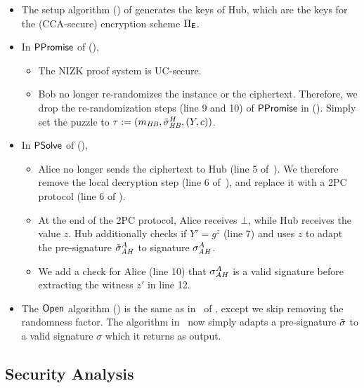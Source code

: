 \begin{itemize}
    \item The setup algorithm () of \aaluc generates the keys of Hub, which are the keys for the (CCA-secure) encryption scheme $\Pi_{\mathsf{E}}$. 
    \item In $\mathsf{PPromise}$ of \aaluc (),
    \begin{itemize}
        \item The NIZK proof system  is UC-secure.
        \item Bob no longer re-randomizes the instance or the ciphertext. Therefore, we drop the re-randomization steps 
        (line 9 and 10) of $\mathsf{PPromise}$ in \aal ().
        Simply set the puzzle to $\tau := (m_{\mathit{HB}}, \tilde{\sigma}_{\mathit{HB}}^H, (Y,c))$.
    \end{itemize}
    \item In $\mathsf{PSolve}$ of \aaluc (),
    \begin{itemize}
        \item Alice no longer sends the ciphertext to Hub 
        (line 5 of~). 
        We therefore remove the local decryption step 
        (line 6 of~), 
        and replace it with a 2PC protocol (line 6 of ).
        \item  At the end of the 2PC protocol, Alice receives $\bot$, while Hub receives the value $z$. Hub additionally  checks if $Y' = g^z$ (line 7) and uses $z$ to adapt the pre-signature $\tilde{\sigma}_{\mathit{AH}}^A$ to signature $\sigma_{\mathit{AH}}^A$.
        \item We add a check for Alice (line 10) that $\sigma_{\mathit{AH}}^A$ is a valid signature before extracting the witness $z'$ in line 12. 
    \end{itemize}
    \item The $\mathsf{Open}$ algorithm () is the same as in~
    of \aal, except we skip removing the randomness factor. The algorithm in~ now simply adapts a pre-signature $\tilde{\sigma}$ to a valid signature $\sigma$ which it returns as output.
\end{itemize}





\subsection{Security Analysis}

